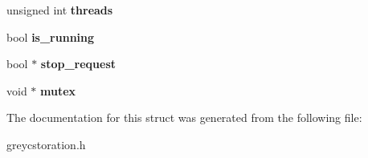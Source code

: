 \begin{DoxyCompactItemize}
\item 
\hypertarget{struct__greycstoration__params_adb908c2742df3d870b4d73e26bcb5ed5}{unsigned int {\bfseries threads}}\label{struct__greycstoration__params_adb908c2742df3d870b4d73e26bcb5ed5}

\item 
\hypertarget{struct__greycstoration__params_aded9a5da746bb5418a9457384109aa61}{bool {\bfseries is\-\_\-running}}\label{struct__greycstoration__params_aded9a5da746bb5418a9457384109aa61}

\item 
\hypertarget{struct__greycstoration__params_a159e65601d204ad1870f70a8c11ea888}{bool $\ast$ {\bfseries stop\-\_\-request}}\label{struct__greycstoration__params_a159e65601d204ad1870f70a8c11ea888}

\item 
\hypertarget{struct__greycstoration__params_a054902814e998e1ae7c241bdd1855e43}{void $\ast$ {\bfseries mutex}}\label{struct__greycstoration__params_a054902814e998e1ae7c241bdd1855e43}

\end{DoxyCompactItemize}


The documentation for this struct was generated from the following file\-:\begin{DoxyCompactItemize}
\item 
greycstoration.\-h\end{DoxyCompactItemize}
